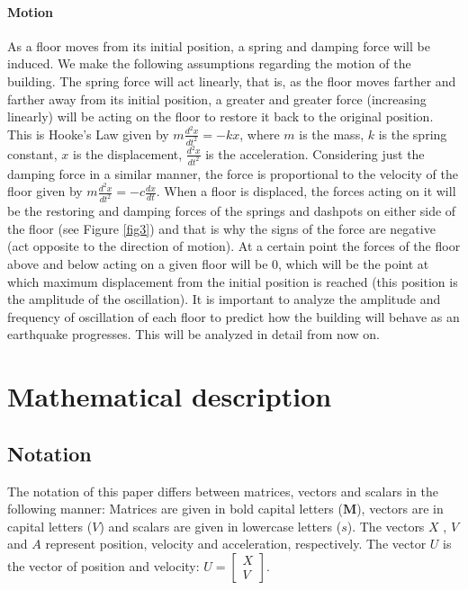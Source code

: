 \documentclass{article}
\begin{document}
			\paragraph{Motion} As a floor moves from its initial position, a spring and damping force will be induced. We make the following assumptions regarding the motion of the building. The spring force will act linearly, that is, as the floor moves farther and farther away from its initial position, a greater and greater force (increasing linearly) will be acting on the floor to restore it back to the original position. This is Hooke's Law given by $m\frac{d^2x}{dt^2} = - kx$, where $m$ is the mass, $k$ is the spring constant, $x$ is the displacement, $\frac{d^2x}{dt^2}$ is the acceleration. Considering just the damping force in a similar manner, the force is  proportional to the velocity of the floor given by $m\frac{d^2x}{dt^2} = - c\frac{dx}{dt}$. When a floor is displaced, the forces acting on it will be the restoring and damping forces of the springs and dashpots on either side of the floor (see Figure \ref{fig3}) and that is why the signs of the force are negative (act opposite to the direction of motion). At a certain point the forces of the floor above and below acting on a given floor will be 0, which will be the point at which maximum displacement from the initial position is reached (this position is the amplitude of the oscillation). It is important to analyze the amplitude and frequency of oscillation of each floor to predict how the building will behave as an earthquake progresses. This will be analyzed in detail from now on. 


	\section{Mathematical description}

		\subsection{Notation} The notation of this paper differs between matrices, vectors and scalars in the following manner: Matrices are given in bold capital letters ($\textbf{M}$), vectors are in capital letters ($V$) and scalars are given in lowercase letters ($s$). The vectors $X$ , $V$ and $A$ represent position, velocity and acceleration, respectively. The vector $U$ is the vector of position and velocity: $U = \begin{bmatrix}X\\V\end{bmatrix}$.
\end{document}
